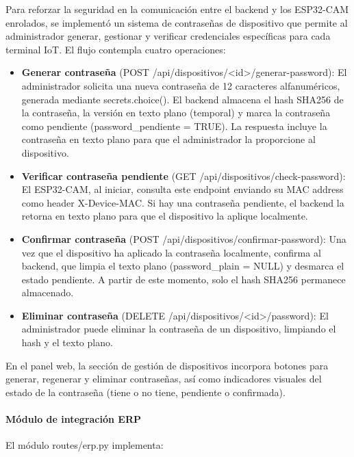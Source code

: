 Para reforzar la seguridad en la comunicación entre el backend y los ESP32-CAM enrolados, se implementó un sistema de contraseñas de dispositivo que permite al administrador generar, gestionar y verificar credenciales específicas para cada terminal IoT. El flujo contempla cuatro operaciones:

\begin{itemize}
    \item \textbf{Generar contraseña} (POST /api/dispositivos/<id>/generar-password): El administrador solicita una nueva contraseña de 12 caracteres alfanuméricos, generada mediante secrets.choice(). El backend almacena el hash SHA256 de la contraseña, la versión en texto plano (temporal) y marca la contraseña como pendiente (password\_pendiente = TRUE). La respuesta incluye la contraseña en texto plano para que el administrador la proporcione al dispositivo.
    \item \textbf{Verificar contraseña pendiente} (GET /api/dispositivos/check-password): El ESP32-CAM, al iniciar, consulta este endpoint enviando su MAC address como header X-Device-MAC. Si hay una contraseña pendiente, el backend la retorna en texto plano para que el dispositivo la aplique localmente.
    \item \textbf{Confirmar contraseña} (POST /api/dispositivos/confirmar-password): Una vez que el dispositivo ha aplicado la contraseña localmente, confirma al backend, que limpia el texto plano (password\_plain = NULL) y desmarca el estado pendiente. A partir de este momento, solo el hash SHA256 permanece almacenado.
    \item \textbf{Eliminar contraseña} (DELETE /api/dispositivos/<id>/password): El administrador puede eliminar la contraseña de un dispositivo, limpiando el hash y el texto plano.
\end{itemize}

En el panel web, la sección de gestión de dispositivos incorpora botones para generar, regenerar y eliminar contraseñas, así como indicadores visuales del estado de la contraseña (tiene o no tiene, pendiente o confirmada).

\paragraph{Módulo de integración ERP}

El módulo routes/erp.py implementa:

